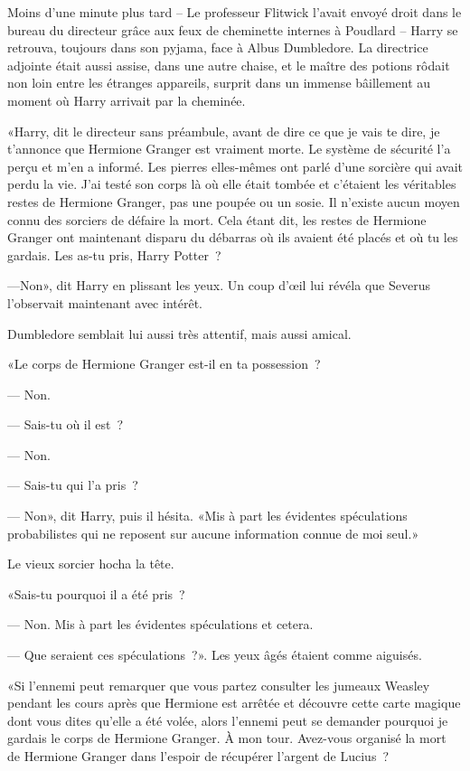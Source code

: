 Moins d'une minute plus tard -- Le professeur Flitwick l'avait envoyé droit dans le bureau du directeur grâce aux feux de cheminette internes à Poudlard -- Harry se retrouva, toujours dans son pyjama, face à Albus Dumbledore. La directrice adjointe était aussi assise, dans une autre chaise, et le maître des potions rôdait non loin entre les étranges appareils, surprit dans un immense bâillement au moment où Harry arrivait par la cheminée.

«Harry, dit le directeur sans préambule, avant de dire ce que je vais te dire, je t'annonce que Hermione Granger est vraiment morte. Le système de sécurité l'a perçu et m'en a informé. Les pierres elles-mêmes ont parlé d'une sorcière qui avait perdu la vie. J'ai testé son corps là où elle était tombée et c'étaient les véritables restes de Hermione Granger, pas une poupée ou un sosie. Il n'existe aucun moyen connu des sorciers de défaire la mort. Cela étant dit, les restes de Hermione Granger ont maintenant disparu du débarras où ils avaient été placés et où tu les gardais. Les as-tu pris, Harry Potter~?

---Non», dit Harry en plissant les yeux. Un coup d'œil lui révéla que Severus l'observait maintenant avec intérêt.

Dumbledore semblait lui aussi très attentif, mais aussi amical.

«Le corps de Hermione Granger est-il en ta possession~?

--- Non.

--- Sais-tu où il est~?

--- Non.

--- Sais-tu qui l'a pris~?

--- Non», dit Harry, puis il hésita. «Mis à part les évidentes spéculations probabilistes qui ne reposent sur aucune information connue de moi seul.»

Le vieux sorcier hocha la tête.

«Sais-tu pourquoi il a été pris~?

--- Non. Mis à part les évidentes spéculations et cetera.

--- Que seraient ces spéculations~?». Les yeux âgés étaient comme aiguisés.

«Si l'ennemi peut remarquer que vous partez consulter les jumeaux Weasley pendant les cours après que Hermione est arrêtée et découvre cette carte magique dont vous dites qu'elle a été volée, alors l'ennemi peut se demander pourquoi je gardais le corps de Hermione Granger. À mon tour. Avez-vous organisé la mort de Hermione Granger dans l'espoir de récupérer l'argent de Lucius~?

